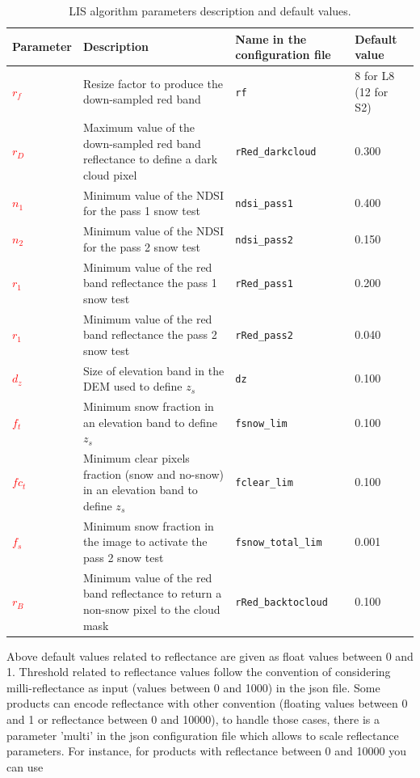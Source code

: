 \documentclass[a4paper]{article}
\begin{document}
\begin{table}[!htbp]
\begin{center}
\begin{tabularx}{\textwidth}{|l X l l|}
\hline
Parameter & Description & Name in the configuration file & Default value\\
\hline
\textcolor{red}{$r_f$} & Resize factor to produce the down-sampled red band & \texttt{rf} & 8 for L8 (12 for S2) \\
\textcolor{red}{$r_D$} & Maximum value of the down-sampled red band reflectance to define a dark cloud pixel & \texttt{rRed\_darkcloud} & 0.300 \\
\textcolor{red}{$n_1$} & Minimum value of the NDSI for the pass 1 snow test & \texttt{ndsi\_pass1} & 0.400\\
\textcolor{red}{$n_2$} & Minimum value of the NDSI for the pass 2 snow test & \texttt{ndsi\_pass2} & 0.150\\
\textcolor{red}{$r_1$} & Minimum value of the red band reflectance the pass 1 snow test  & \texttt{rRed\_pass1} & 0.200 \\
\textcolor{red}{$r_1$} & Minimum value of the red band reflectance the pass 2 snow test  & \texttt{rRed\_pass2} & 0.040 \\
\textcolor{red}{$d_z$} & Size of elevation band in the DEM used to define $z_s$ & \texttt{dz} & 0.100 \\
\textcolor{red}{$f_t$} & Minimum snow fraction in an elevation band to define $z_s$ & \texttt{fsnow\_lim} & 0.100 \\
\textcolor{red}{$fc_t$} & Minimum clear pixels fraction (snow and no-snow) in an elevation band to define $z_s$ & \texttt{fclear\_lim} & 0.100 \\
\textcolor{red}{$f_s$} & Minimum snow fraction in the image to activate the pass 2 snow test & \texttt{fsnow\_total\_lim} & 0.001 \\
\textcolor{red}{$r_B$} & Minimum value of the red band reflectance to return a non-snow pixel to the cloud mask & \texttt{rRed\_backtocloud} & 0.100 \\
\hline
\end{tabularx}
\end{center}
\caption{LIS algorithm parameters description and default values.}
\end{table}\label{tab:param}

Above default values related to reflectance are given as float values between 0
and 1. Threshold related to reflectance values follow the convention of
considering milli-reflectance as input (values between 0 and 1000) in the json
file. Some products can encode reflectance with other convention (floating
values between 0 and 1 or reflectance between 0 and 10000), to handle those
cases, there is a parameter 'multi' in the json configuration file which allows
to scale reflectance parameters. For instance, for products with reflectance
between 0 and 10000 you can use
\end{document}
